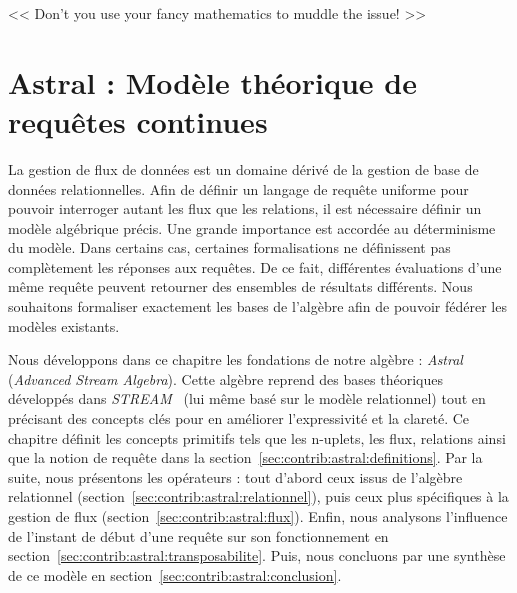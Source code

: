 \begin{savequote}[6cm]
<< Don't you use your fancy mathematics to muddle the issue! >>
\end{savequote}

\chapter{Astral : Modèle théorique de requêtes continues}\label{chap:contrib:astral}
\chaptertoc

La gestion de flux de données est un domaine dérivé de la gestion de base de données relationnelles. Afin de définir un langage de requête uniforme pour pouvoir interroger autant les flux que les relations, il est nécessaire définir un modèle algébrique précis. Une grande importance est accordée au déterminisme du modèle. Dans certains cas, certaines formalisations ne définissent pas complètement les réponses aux requêtes. De ce fait, différentes évaluations d'une même requête peuvent retourner des ensembles de résultats différents. Nous souhaitons formaliser exactement les bases de l'algèbre afin de pouvoir fédérer les modèles existants.

Nous développons dans ce chapitre les fondations de notre algèbre : \textit{Astral} (\textit{Advanced Stream Algebra}). Cette algèbre reprend des bases théoriques développés dans \textit{STREAM}~\cite{Arasu:stream} (lui même basé sur le modèle relationnel) tout en précisant des concepts clés pour en améliorer l'expressivité et la clareté. Ce chapitre définit les concepts primitifs tels que les n-uplets, les flux, relations ainsi que la notion de requête dans la section~\ref{sec:contrib:astral:definitions}. Par la suite, nous présentons les opérateurs : tout d'abord ceux issus de l'algèbre relationnel (section~\ref{sec:contrib:astral:relationnel}), puis ceux plus spécifiques à la gestion de flux (section~\ref{sec:contrib:astral:flux}). Enfin, nous analysons l'influence de l'instant de début d'une requête sur son fonctionnement en section~\ref{sec:contrib:astral:transposabilite}. Puis, nous concluons par une synthèse de ce modèle en section~\ref{sec:contrib:astral:conclusion}.






